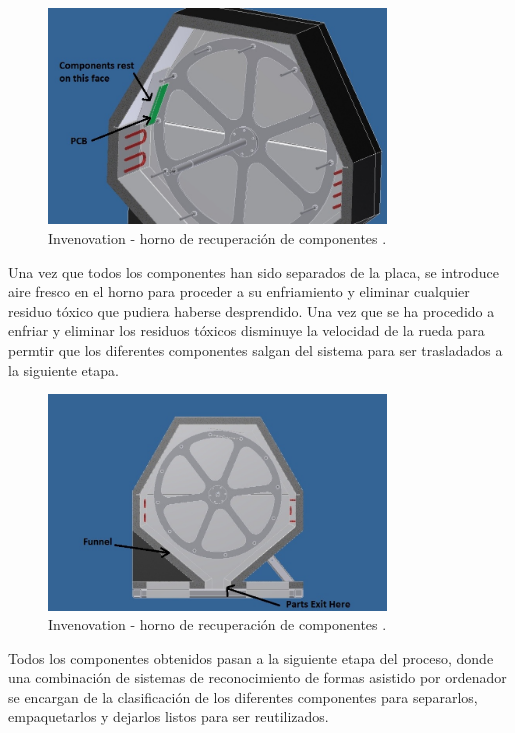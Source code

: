 \begin{figure}[H]
\begin{center}
\includegraphics[width=0.8\textwidth]{img/D6}
\caption{Invenovation - horno de recuperación de componentes \cite{invenovation}.}
\end{center}
\end{figure}

Una vez que todos los componentes han sido separados de la placa, se introduce aire fresco en el horno para proceder a su enfriamiento y eliminar cualquier residuo tóxico que pudiera haberse desprendido. Una vez que se ha procedido a enfriar y eliminar los residuos tóxicos disminuye la velocidad de la rueda para permtir que los diferentes componentes salgan del sistema para ser trasladados a la siguiente etapa.

\begin{figure}[H]
\begin{center}
\includegraphics[width=0.8\textwidth]{img/D5}
\caption{Invenovation - horno de recuperación de componentes \cite{invenovation}.}
\end{center}
\end{figure}

Todos los componentes obtenidos pasan a la siguiente etapa del proceso, donde una combinación de sistemas de reconocimiento de formas asistido por ordenador se encargan de la clasificación de los diferentes componentes para separarlos, empaquetarlos y dejarlos listos para ser reutilizados.

